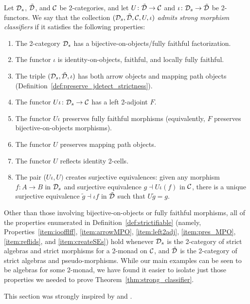 \documentclass[11pt,oneside,article]{memoir}
\begin{document}
\begin{definition}
      \label{def:strictifiable}
Let $\mathcal{D}_s$, $\tilde{\mathcal{D}}$, and $\mathcal{C}$ be 2-categories, and let $U\colon\tilde{\mathcal{D}}\to\mathcal{C}$ and
$\iota\colon\mathcal{D}_s\to\tilde{\mathcal{D}}$ be 2-functors. We say that the collection
$(\mathcal{D}_s,\tilde{\mathcal{D}},\mathcal{C},U,\iota)$ \emph{admits strong morphism classifiers} if it satisfies the
following properties:
\begin{enumerate}
   \item\label{item:boff}
      The 2-category $\mathcal{D}_s$ has a bijective-on-objects/fully faithful factorization.
   \item\label{item:ioofflff}
      The functor $\iota$ is identity-on-objects, faithful, and locally fully faithful.
   \item\label{item:arrowMPO}
      The triple $(\mathcal{D}_s,\tilde{\mathcal{D}},\iota)$ has both arrow objects and mapping path objects
      (Definition~\ref{def:preserve_jdetect_strictness}).
   \item\label{item:left2adj}
      The functor $U\iota\colon\mathcal{D}_s\to\mathcal{C}$ has a left 2-adjoint $F$.
   \item\label{item:pres_ff}
      The functor $U\iota$ preserves fully faithful morphisms (equivalently, $F$ preserves
      bijective-on-objects morphisms).
   \item\label{item:pres_MPO}
      The functor $U$ preserves mapping path objects.
   \item\label{item:reflids}
      The functor $U$ reflects identity 2-cells.
   \item\label{item:createSEs}
      The pair ($U\iota,U)$ creates surjective equivalences: given any morphism $f\colon A\to B$ in
      $\mathcal{D}_s$ and surjective equivalence $g\dashv U\iota(f)$ in $\mathcal{C}$, there is a unique
      surjective equivalence $\tilde{g}\dashv\iota f$ in $\tilde{\mathcal{D}}$ such that $U\tilde{g}=g$.
\end{enumerate}
\end{definition}

\begin{remark}
   Other than those involving bijective-on-objects or fully faithful morphisms, all of the
   properties enumerated in Definition~\ref{def:strictifiable} (namely,
   Properties~\ref{item:ioofflff}, \ref{item:arrowMPO}, \ref{item:left2adj}, \ref{item:pres_MPO},
   \ref{item:reflids}, and \ref{item:createSEs}) hold whenever $\mathcal{D}_s$ is the 2-category of
   strict algebras and strict morphisms for a 2-monad on $\mathcal{C}$, and $\tilde{\mathcal{D}}$ is the
   2-category of strict algebras and pseudo-morphisms. While our main examples can be seen to be
   algebras for some 2-monad, we have found it easier to isolate just those properties we needed to
   prove Theorem~\ref{thm:strong_classifier}.

   This section was strongly inspired by \cite{Bourke} and \cite{LackHomotopy}.
\end{remark}
\end{document}
